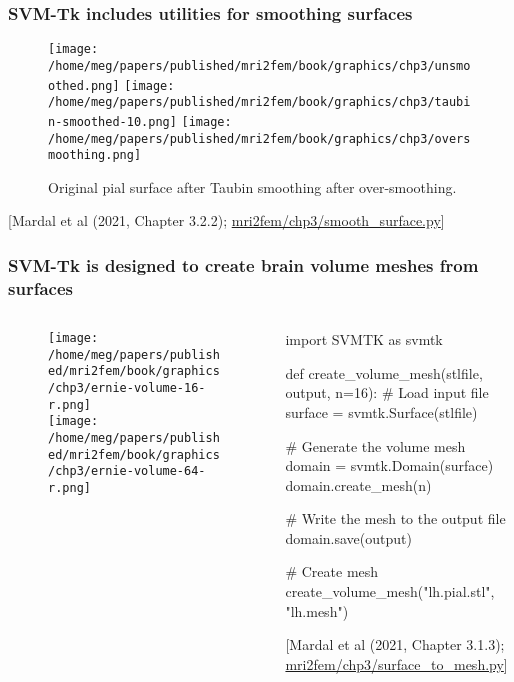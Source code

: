 \documentclass[10pt, mathserif, aspectratio=169, t, usenames, dvipsnames]{beamer}
\newcommand{\refer}[1]{\begin{flushright}{\tiny \textcolor{Cerulean}{[#1]}}\end{flushright}}
\begin{document}
\begin{frame}
  \frametitle{SVM-Tk includes utilities for smoothing surfaces}
  \begin{figure}
  \centering
  \texttt{[image: /home/meg/papers/published/mri2fem/book/graphics/chp3/unsmoothed.png]}
  \texttt{[image: /home/meg/papers/published/mri2fem/book/graphics/chp3/taubin-smoothed-10.png]}
  \texttt{[image: /home/meg/papers/published/mri2fem/book/graphics/chp3/oversmoothing.png]}

  Original pial surface \hspace{3em} after Taubin smoothing \hspace{3em}
after over-smoothing.
  \end{figure}
  \bigskip
  
  \refer{Mardal et al (2021, Chapter 3.2.2); \href{https://github.com/kent-and/mri2fem/blob/master/mri2fem/mri2fem/chp3/smooth_surface.py}{mri2fem/chp3/smooth\_surface.py}}
\end{frame}

\begin{frame}[fragile]
\frametitle{SVM-Tk is designed to create brain volume meshes from surfaces}

\begin{columns}
\begin{column}{0.34\textwidth}
\begin{figure}
  \centering
  \texttt{[image: /home/meg/papers/published/mri2fem/book/graphics/chp3/ernie-volume-16-r.png]} \\
  \texttt{[image: /home/meg/papers/published/mri2fem/book/graphics/chp3/ernie-volume-64-r.png]}
\end{figure}
\end{column}
\begin{column}{0.65\textwidth}
  \begin{python}
import SVMTK as svmtk

def create_volume_mesh(stlfile, output, n=16):
    # Load input file
    surface = svmtk.Surface(stlfile)
    
    # Generate the volume mesh
    domain = svmtk.Domain(surface)
    domain.create_mesh(n)

    # Write the mesh to the output file
    domain.save(output)

# Create mesh    
create_volume_mesh("lh.pial.stl", "lh.mesh")
  \end{python}
  \refer{Mardal et al (2021, Chapter 3.1.3); \href{https://github.com/kent-and/mri2fem/blob/master/mri2fem/mri2fem/chp3/surface_to_mesh.py}{mri2fem/chp3/surface\_to\_mesh.py}}
\end{column}
\end{columns}

\end{frame}
\end{document}
